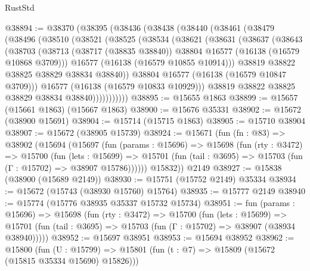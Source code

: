 \begin{lexlean}{RustStd}
\begin{coremodule}
@38894 := @38370
    (@38395
      (@38436
        (@38438
          (@38440
            (@38461
              (@38479
                (@38496
                  (@38510
                    (@38521
                      (@38525
                        (@38534
                          (@38621
                            (@38631
                              (@38637
                                (@38643
                                  (@38703
                                    (@38713
                                      (@38717 (@38835 @38840))
                                      @38804
                                      @16577
                                      (@16138 (@16579 @10868 @3709)))
                                    @16577
                                    (@16138 (@16579 @10855 @10914)))
                                  @38819
                                  @38822
                                  @38825
                                  @38829
                                  @38834
                                  @38840))
                              @38804
                              @16577
                              (@16138 (@16579 @10847 @3709)))
                            @16577
                            (@16138 (@16579 @10833 @10929)))
                          @38819
                          @38822
                          @38825
                          @38829
                          @38834
                          @38840)))))))))))
@38895 := @15655 @1863
@38899 := @15657 (@15661 @1863) (@15667 @1863)
@38900 := @15676 @35331
@38902 := @15672 (@38900 @15691)
@38904 := @15714 (@15715 @1863)
@38905 := @15710 @38904
@38907 := @15672 (@38905 @15739)
@38924 := @15671
    (fun (fn : @83) =>
    @38902
      (@15694
        (@15697
          (fun (params : @15696) =>
          @15698
            (fun (rty : @3472) =>
            @15700
              (fun (lets : @15699) =>
              @15701 (fun (tail : @3695) => @15703 (fun (Γ : @15702) => @38907 @15786))))))
        @15832))
    @2149
@38927 := @15838 (@38900 (@15689 @2149))
@38930 := @15751 (@15752 @2149) @35334
@38934 := @15672 (@15743 (@38930 @15760) @15764)
@38935 := @15777 @2149
@38940 := @15774 (@15776 @38935 @35337 @15732 @15734)
@38951 := fun (params : @15696) =>
  @15698
    (fun (rty : @3472) =>
    @15700
      (fun (lets : @15699) =>
      @15701 (fun (tail : @3695) => @15703 (fun (Γ : @15702) => @38907 (@38934 @38940)))))
@38952 := @15697 @38951
@38953 := @15694 @38952
@38962 := @15800
    (fun (U : @15799) => @15801 (fun (t : @7) => @15809 (@15672 (@15815 @35334 @15690) @15826)))

\end{coremodule}
\end{lexlean}
